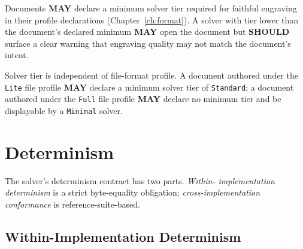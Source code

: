 \documentclass[11pt,letterpaper]{report}
\newcounter{requirement}[chapter]
\newcommand{\SHOULD}{\textbf{SHOULD}}
\newcommand{\MAY}{\textbf{MAY}}
\begin{document}
\begin{requirement}
  \label{req:solver:solver-tier-compatibility}
  Documents \MAY{} declare a minimum solver tier required for
  faithful engraving in their profile declarations
  (Chapter~\ref{ch:format}). A solver with tier lower than the
  document's declared minimum \MAY{} open the document but
  \SHOULD{} surface a clear warning that engraving quality may
  not match the document's intent.

  Solver tier is independent of file-format profile. A document
  authored under the \texttt{Lite} file profile \MAY{} declare a
  minimum solver tier of \texttt{Standard}; a document authored
  under the \texttt{Full} file profile \MAY{} declare no minimum
  tier and be displayable by a \texttt{Minimal} solver.
\end{requirement}

\section{Determinism}
\label{sec:solver:determinism}

The solver's determinism contract has two parts. \emph{Within-
implementation determinism} is a strict byte-equality obligation;
\emph{cross-implementation conformance} is reference-suite-based.

\subsection{Within-Implementation Determinism}
\end{document}
